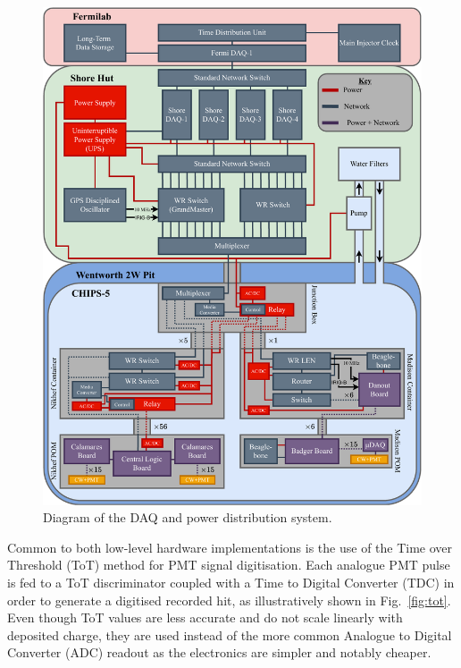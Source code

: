 \begin{figure} %
    \includegraphics[width=\textwidth]{diagrams/5-daq/daq.pdf}
    \caption[Diagram of the \chipsfive data acquisition and power distribution system.]
    {Diagram of the \chipsfive DAQ and power distribution system.}
    \label{fig:daq}
\end{figure}

Common to both low-level hardware implementations is the use of the Time over Threshold (ToT)
method for PMT signal digitisation. Each analogue PMT pulse is fed to a ToT discriminator coupled
with a Time to Digital Converter (TDC) in order to generate a digitised recorded hit, as
illustratively shown in Fig.~\ref{fig:tot}. Even though ToT values are less accurate and do not
scale linearly with deposited charge, they are used instead of the more common Analogue to Digital
Converter (ADC) readout as the electronics are simpler and notably cheaper.

